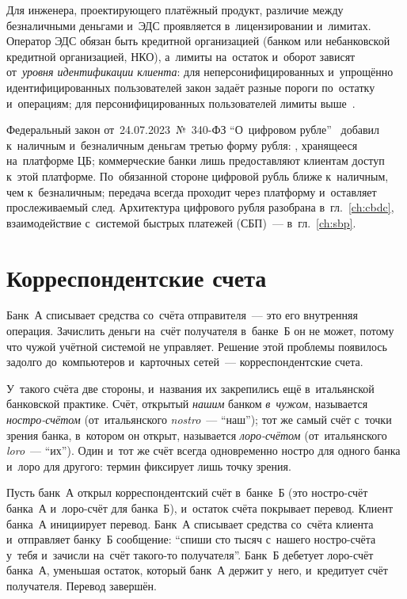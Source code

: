 Для инженера, проектирующего платёжный продукт, различие между безналичными
деньгами и~ЭДС проявляется в~лицензировании и~лимитах. Оператор ЭДС обязан быть
кредитной организацией (банком или небанковской кредитной организацией, НКО),
а~лимиты на~остаток и~оборот зависят от~\textit{уровня идентификации клиента}:
для неперсонифицированных и~упрощённо идентифицированных пользователей закон
задаёт разные пороги по~остатку и~операциям; для персонифицированных
пользователей лимиты выше~\cite{fz-161}.

Федеральный закон от~24.07.2023~№~340-ФЗ \enquote{О~цифровом
рубле}~\cite{fz-340} добавил к~наличным и~безналичным деньгам третью форму рубля:
, хранящееся
на~платформе ЦБ; коммерческие банки лишь предоставляют клиентам доступ к~этой
платформе. По~обязанной стороне цифровой рубль ближе к~наличным,
чем к~безналичным; передача всегда проходит через платформу и~оставляет
прослеживаемый след. Архитектура цифрового рубля разобрана
в~гл.~\ref{ch:cbdc}, взаимодействие с~системой быстрых платежей (СБП)~---
в~гл.~\ref{ch:sbp}.

\section{Корреспондентские счета}\label{sec:banks-correspondent}

Банк~А списывает средства со~счёта отправителя~--- это его внутренняя операция.
Зачислить деньги на~счёт получателя в~банке~Б он не может, потому что чужой
учётной системой не управляет. Решение этой проблемы появилось задолго
до~компьютеров и~карточных сетей~--- корреспондентские счета.

У~такого счёта две стороны, и~названия их закрепились ещё в~итальянской
банковской практике. Счёт, открытый \emph{нашим} банком \emph{в~чужом},
называется \textit{ностро-счётом} (от~итальянского \emph{nostro}~---
\enquote{наш}); тот же самый счёт с~точки зрения банка, в~котором он открыт,
называется \textit{лоро-счётом} (от~итальянского \emph{loro}~--- \enquote{их}).
Один и~тот же счёт всегда одновременно ностро для одного банка и~лоро для
другого: термин фиксирует лишь точку зрения.

Пусть банк~А открыл корреспондентский счёт в~банке~Б (это ностро-счёт банка~А
и~лоро-счёт для банка~Б), и~остаток счёта покрывает перевод. Клиент банка~А
инициирует перевод. Банк~А списывает средства со~счёта клиента и~отправляет
банку~Б сообщение: \enquote{спиши сто тысяч с~нашего ностро-счёта у~тебя
и~зачисли на~счёт такого-то получателя}. Банк~Б дебетует лоро-счёт банка~А,
уменьшая остаток, который банк~А держит у~него, и~кредитует счёт получателя.
Перевод завершён.

